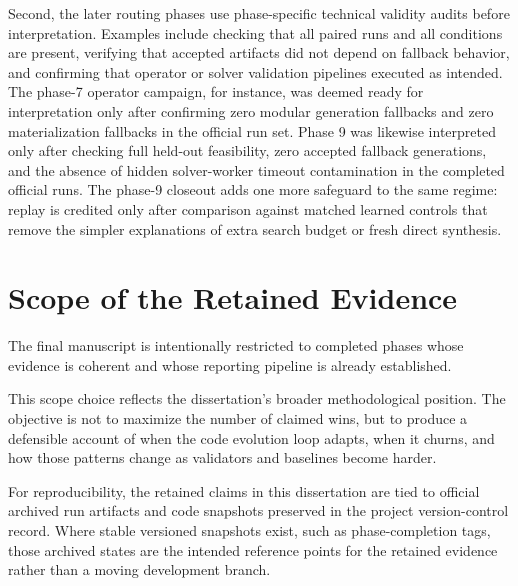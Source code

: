 Second, the later routing phases use phase-specific technical validity audits before interpretation.
Examples include checking that all paired runs and all conditions are present, verifying that
accepted artifacts did not depend on fallback behavior, and confirming that operator or solver
validation pipelines executed as intended. The phase-7 operator campaign, for instance, was deemed
ready for interpretation only after confirming zero modular generation fallbacks and zero
materialization fallbacks in the official run set. Phase 9 was likewise interpreted only after
checking full held-out feasibility, zero accepted fallback generations, and the absence of hidden
solver-worker timeout contamination in the completed official runs. The phase-9 closeout adds one
more safeguard to the same regime: replay is credited only after comparison against matched learned
controls that remove the simpler explanations of extra search budget or fresh direct synthesis.

\section{Scope of the Retained Evidence}
\label{sec:methods-scope}

The final manuscript is intentionally restricted to completed phases whose evidence is coherent and
whose reporting pipeline is already established.

This scope choice reflects the dissertation's broader methodological position. The objective is not
to maximize the number of claimed wins, but to produce a defensible account of when the code
evolution loop adapts, when it churns, and how those patterns change as validators and baselines
become harder.

For reproducibility, the retained claims in this dissertation are tied to official archived run
artifacts and code snapshots preserved in the project version-control record. Where stable
versioned snapshots exist, such as phase-completion tags, those archived states are the intended
reference points for the retained evidence rather than a moving development branch.
